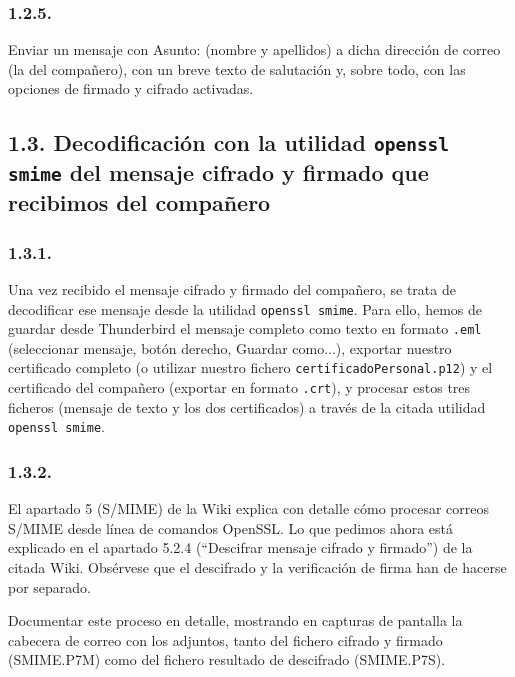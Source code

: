 \subsubsection*{1.2.5.}
Enviar un mensaje con Asunto: (nombre y apellidos) a dicha dirección de correo (la del compañero), con un breve
texto de salutación y, sobre todo, con las opciones de firmado y cifrado activadas.

\subsection*{1.3. Decodificación con la utilidad \texttt{openssl smime} del mensaje cifrado y firmado que recibimos del compañero}

\subsubsection*{1.3.1.}
Una vez recibido el mensaje cifrado y firmado del compañero, se trata de decodificar ese mensaje desde la
utilidad \texttt{openssl smime}. Para ello, hemos de guardar desde Thunderbird el mensaje completo como texto
en formato \texttt{.eml} (seleccionar mensaje, botón derecho, Guardar como...), exportar nuestro certificado
completo (o utilizar nuestro fichero \texttt{certificadoPersonal.p12}) y el certificado del compañero (exportar
en formato \texttt{.crt}), y procesar estos tres ficheros (mensaje de texto y los dos certificados) a través de la
citada utilidad \texttt{openssl smime}.

\subsubsection*{1.3.2.}
El apartado 5 (S/MIME) de la Wiki explica con detalle cómo procesar correos S/MIME desde línea de comandos
OpenSSL. Lo que pedimos ahora está explicado en el apartado 5.2.4 (``Descifrar mensaje cifrado y firmado'')
de la citada Wiki. Obsérvese que el descifrado y la verificación de firma han de hacerse por separado.

Documentar este proceso en detalle, mostrando en capturas de pantalla la cabecera de correo con los adjuntos,
tanto del fichero cifrado y firmado (SMIME.P7M) como del fichero resultado de descifrado (SMIME.P7S).
